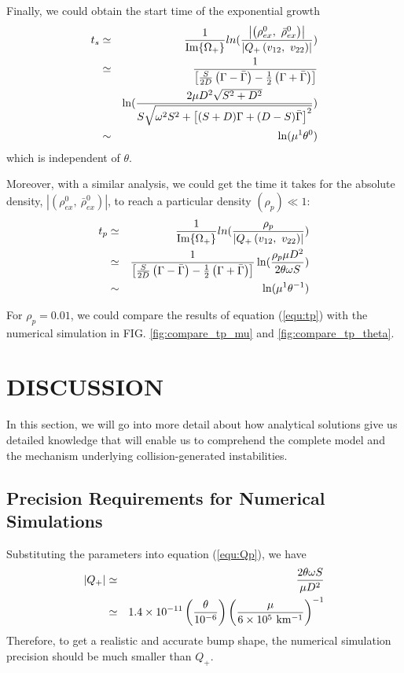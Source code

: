 \documentclass[aps,prd,twocolumn,amsmath,amssymb,groupedaddress]{revtex4-2}
\begin{document}
Finally, we could obtain the start time of the exponential growth
\begin{eqnarray}
	t_s	&\simeq& 
	\frac{1}{\rm{Im}\{\Omega_+\}}ln(\frac{\left| \left(\rho^0_{ex}, ~\bar{\rho}^0_{ex}\right) \right|}{\left|Q_+\left(v_{12}, ~ v_{22}\right)\right|})	\nonumber \\
	&\simeq&
	\frac{1}{\left[\frac{S}{2D}\left(\Gamma-\bar{\Gamma}\right)-\frac{1}{2}\left(\Gamma+\bar{\Gamma}\right)\right]} \nonumber \\
	&&\ln(\frac{2\mu D^2\sqrt{S^2+D^2}}{S\sqrt{\omega^2S^2+\left[(S+D) \Gamma + (D-S) \bar{\Gamma}\right]^2}}) \\
	&\sim& \ln(\mu^1 \theta^0)
\end{eqnarray}
which is independent of $\theta$.

Moreover, with a similar analysis, we could get the time it takes for the absolute density, $\left| \left(\rho^0_{ex}, ~\bar{\rho}^0_{ex}\right) \right|$, to reach a particular density $(\rho_{p}) \ll 1$:
\begin{eqnarray}
	\label{equ:tp}
	t_{p}	&\simeq& 
	\frac{1}{\rm{Im}\{\Omega_+\}}ln(\frac{\rho_{p}}{\left|Q_+\left(v_{12}, ~ v_{22}\right)\right|})	\nonumber \\
	&\simeq&
	\frac{1}{\left[\frac{S}{2D}\left(\Gamma-\bar{\Gamma}\right)-\frac{1}{2}\left(\Gamma+\bar{\Gamma}\right)\right]} \ln(\frac{\rho_{p} \mu D^2}{2\theta \omega S}) \\
	&\sim& \ln(\mu^1 \theta^{-1})
\end{eqnarray}

For $\rho_p = 0.01$, we could compare the results of equation (\ref{equ:tp}) with the numerical simulation in FIG. \ref{fig:compare_tp_mu} and \ref{fig:compare_tp_theta}.

\section{\label{sec:disscussion} DISCUSSION}
In this section, we will go into more detail about how analytical solutions give us detailed knowledge that will enable us to comprehend the complete model and the mechanism underlying collision-generated instabilities.

\subsection{\label{subsec:precision_of_num}Precision Requirements for Numerical Simulations}
Substituting the parameters into equation (\ref{equ:Qp}), we have 
\begin{eqnarray}
	\label{equ:Qp_num}
	\left|Q_+\right|
	&\simeq&
	\frac{2 \theta\omega S}{\mu D^2}\nonumber \\
	&\simeq&
	1.4 \times 10^{-11} \left(\frac{\theta}{10^{-6}}\right) \left(\frac{\mu}{6 \times 10^5 \rm{~km^{-1}}}\right)^{-1}
\end{eqnarray}
Therefore, to get a realistic and accurate bump shape, the numerical simulation precision should be much smaller than $Q_+$. 
\end{document}

